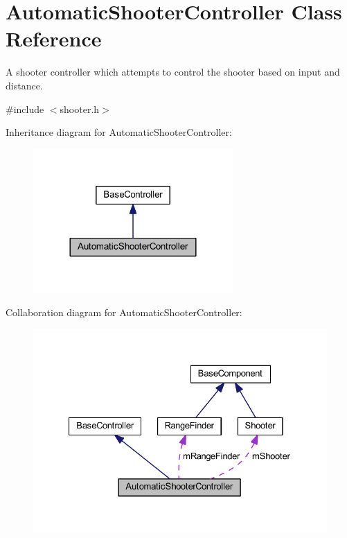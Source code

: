 \hypertarget{class_automatic_shooter_controller}{\section{\-Automatic\-Shooter\-Controller \-Class \-Reference}
\label{class_automatic_shooter_controller}
}


\-A shooter controller which attempts to control the shooter based on input and distance.  




{\ttfamily \#include $<$shooter.\-h$>$}



\-Inheritance diagram for \-Automatic\-Shooter\-Controller\-:\nopagebreak
\begin{figure}[H]
\begin{center}
\leavevmode
\includegraphics[width=216pt]{class_automatic_shooter_controller__inherit__graph}
\end{center}
\end{figure}


\-Collaboration diagram for \-Automatic\-Shooter\-Controller\-:\nopagebreak
\begin{figure}[H]
\begin{center}
\leavevmode
\includegraphics[width=327pt]{class_automatic_shooter_controller__coll__graph}
\end{center}
\end{figure}
